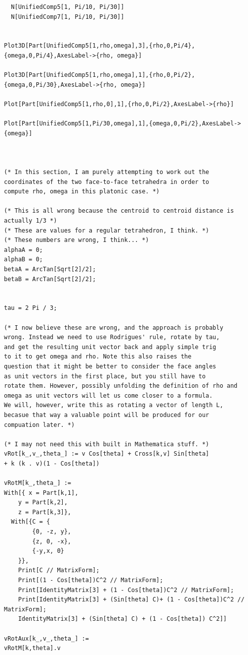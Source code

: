 \documentclass[11pt]{article}
\begin{document}
{\begin{verbatim}
  N[UnifiedComp5[1, Pi/10, Pi/30]]
  N[UnifiedComp7[1, Pi/10, Pi/30]]  


Plot3D[Part[UnifiedComp5[1,rho,omega],3],{rho,0,Pi/4},{omega,0,Pi/4},AxesLabel->{rho, omega}]

Plot3D[Part[UnifiedComp5[1,rho,omega],1],{rho,0,Pi/2},{omega,0,Pi/30},AxesLabel->{rho, omega}]

Plot[Part[UnifiedComp5[1,rho,0],1],{rho,0,Pi/2},AxesLabel->{rho}]

Plot[Part[UnifiedComp5[1,Pi/30,omega],1],{omega,0,Pi/2},AxesLabel->{omega}]
  


(* In this section, I am purely attempting to work out the
coordinates of the two face-to-face tetrahedra in order to
compute rho, omega in this platonic case. *)

(* This is all wrong because the centroid to centroid distance is actually 1/3 *)
(* These are values for a regular tetrahedron, I think. *)
(* These numbers are wrong, I think... *)
alphaA = 0;
alphaB = 0;
betaA = ArcTan[Sqrt[2]/2];
betaB = ArcTan[Sqrt[2]/2];


tau = 2 Pi / 3;

(* I now believe these are wrong, and the approach is probably
wrong. Instead we need to use Rodrigues' rule, rotate by tau,
and get the resulting unit vector back and apply simple trig
to it to get omega and rho. Note this also raises the
question that it might be better to consider the face angles
as unit vectors in the first place, but you still have to
rotate them. However, possibly unfolding the definition of rho and
omega as unit vectors will let us come closer to a formula.
We will, however, write this as rotating a vector of length L,
becasue that way a valuable point will be produced for our
compuation later. *)

(* I may not need this with built in Mathematica stuff. *)
vRot[k_,v_,theta_] := v Cos[theta] + Cross[k,v] Sin[theta]
+ k (k . v)(1 - Cos[theta])

vRotM[k_,theta_] :=
With[{ x = Part[k,1],
    y = Part[k,2],
    z = Part[k,3]},
  With[{C = {
        {0, -z, y},
        {z, 0, -x},
        {-y,x, 0}
    }},
    Print[C // MatrixForm];
    Print[(1 - Cos[theta])C^2 // MatrixForm];
    Print[IdentityMatrix[3] + (1 - Cos[theta])C^2 // MatrixForm];
    Print[IdentityMatrix[3] + (Sin[theta] C)+ (1 - Cos[theta])C^2 // MatrixForm];        
    IdentityMatrix[3] + (Sin[theta] C) + (1 - Cos[theta]) C^2]]

vRotAux[k_,v_,theta_] :=
vRotM[k,theta].v


\end{verbatim}}
\end{document}
